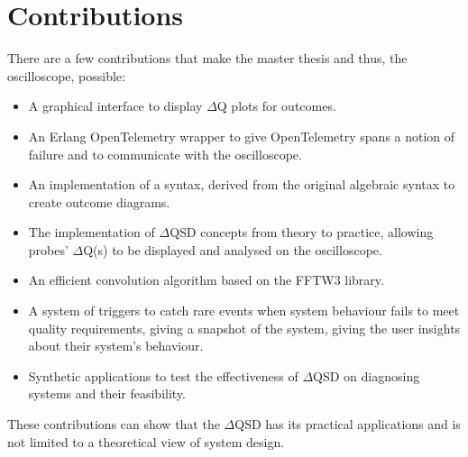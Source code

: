 \section{Contributions}
    There are a few contributions that make the master thesis and thus, the oscilloscope, possible:
    \begin{itemize}
        \item A graphical interface to display $\Delta$Q plots for outcomes.
        \item An Erlang OpenTelemetry wrapper to give OpenTelemetry spans a notion of failure and to communicate with the oscilloscope.
        \item An implementation of a syntax, derived from the original algebraic syntax to create outcome diagrams. 
        \item The implementation of $\Delta$QSD concepts from theory to practice, allowing probes' $\Delta$Q(s) to be displayed and analysed on the oscilloscope.
        \item An efficient convolution algorithm based on the FFTW3 library.
        \item A system of triggers to catch rare events when system behaviour fails to meet quality requirements, giving a snapshot of the system, giving the user insights about their system's behaviour.
        \item Synthetic applications to test the effectiveness of $\Delta$QSD on diagnosing systems and their feasibility.
    \end{itemize}
    These contributions can show that the $\Delta$QSD has its practical applications and is not limited to a theoretical view of system design.

